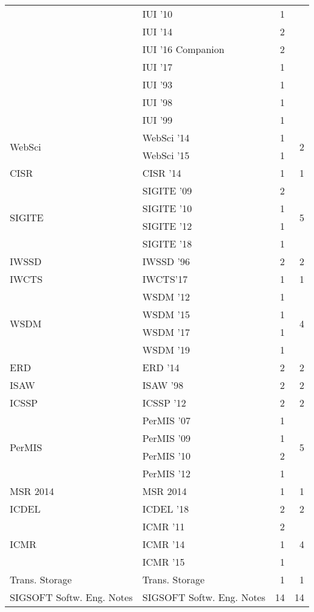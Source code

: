 \begin{table*}[t]
\begin{tabular}{llrr}
& IUI '10 & 1 &\\
& IUI '14 & 2 &\\
& IUI '16 Companion & 2 &\\
& IUI '17 & 1 &\\
& IUI '93 & 1 &\\
& IUI '98 & 1 &\\
& IUI '99 & 1 &\\
\multirow{2}{*}{WebSci } & WebSci '14 & 1 & \multirow{2}{*}{2}\\
& WebSci '15 & 1 &\\
\multirow{1}{*}{CISR } & CISR '14 & 1 & \multirow{1}{*}{1}\\
\multirow{4}{*}{SIGITE } & SIGITE '09 & 2 & \multirow{4}{*}{5}\\
& SIGITE '10 & 1 &\\
& SIGITE '12 & 1 &\\
& SIGITE '18 & 1 &\\
\multirow{1}{*}{IWSSD } & IWSSD '96 & 2 & \multirow{1}{*}{2}\\
\multirow{1}{*}{IWCTS} & IWCTS'17 & 1 & \multirow{1}{*}{1}\\
\multirow{4}{*}{WSDM } & WSDM '12 & 1 & \multirow{4}{*}{4}\\
& WSDM '15 & 1 &\\
& WSDM '17 & 1 &\\
& WSDM '19 & 1 &\\
\multirow{1}{*}{ERD } & ERD '14 & 2 & \multirow{1}{*}{2}\\
\multirow{1}{*}{ISAW } & ISAW '98 & 2 & \multirow{1}{*}{2}\\
\multirow{1}{*}{ICSSP } & ICSSP '12 & 2 & \multirow{1}{*}{2}\\
\multirow{4}{*}{PerMIS } & PerMIS '07 & 1 & \multirow{4}{*}{5}\\
& PerMIS '09 & 1 &\\
& PerMIS '10 & 2 &\\
& PerMIS '12 & 1 &\\
\multirow{1}{*}{MSR 2014} & MSR 2014 & 1 & \multirow{1}{*}{1}\\
\multirow{1}{*}{ICDEL } & ICDEL '18 & 2 & \multirow{1}{*}{2}\\
\multirow{3}{*}{ICMR } & ICMR '11 & 2 & \multirow{3}{*}{4}\\
& ICMR '14 & 1 &\\
& ICMR '15 & 1 &\\
\multirow{1}{*}{Trans. Storage} & Trans. Storage & 1 & \multirow{1}{*}{1}\\
\multirow{1}{*}{SIGSOFT Softw. Eng. Notes} & SIGSOFT Softw. Eng. Notes & 14 & \multirow{1}{*}{14}\\

\end{tabular}
\end{table*}
